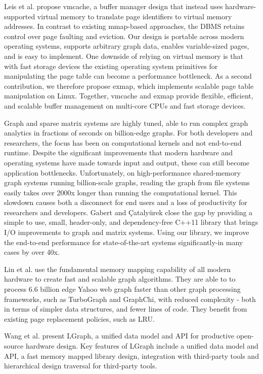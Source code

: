 Leis et al. \cite{leis2023virtual} propose vmcache, a buffer manager design that instead uses hardware-supported virtual memory to translate page identifiers to virtual memory addresses. In contrast to existing mmap-based approaches, the DBMS retains control over page faulting and eviction. Our design is portable across modern operating systems, supports arbitrary graph data, enables variable-sized pages, and is easy to implement. One downside of relying on virtual memory is that with fast storage devices the existing operating system primitives for manipulating the page table can become a performance bottleneck. As a second contribution, we therefore propose exmap, which implements scalable page table manipulation on Linux. Together, vmcache and exmap provide flexible, efficient, and scalable buffer management on multi-core CPUs and fast storage devices.




Graph and sparse matrix systems are highly tuned, able to run complex graph analytics in fractions of seconds on billion-edge graphs. For both developers and researchers, the focus has been on computational kernels and not end-to-end runtime. Despite the significant improvements that modern hardware and operating systems have made towards input and output, these can still become application bottlenecks. Unfortunately, on high-performance shared-memory graph systems running billion-scale graphs, reading the graph from file systems easily takes over 2000x longer than running the computational kernel. This slowdown causes both a disconnect for end users and a loss of productivity for researchers and developers. Gabert and Çatalyürek \cite{gabert2021pigo} close the gap by providing a simple to use, small, header-only, and dependency-free C++11 library that brings I/O improvements to graph and matrix systems. Using our library, we improve the end-to-end performance for state-of-the-art systems significantly-in many cases by over 40x.

Lin et al. \cite{lin2014mmap} use the fundamental memory mapping capability of all modern hardware to create fast and scalable graph algorithms. They are able to to process 6.6 billion edge Yahoo web graph faster than other graph processing frameworks, such as TurboGraph and GraphChi, with reduced complexity - both in terms of simpler data structures, and fewer lines of code. They benefit from existing page replacement policies, such as LRU.

Wang et al. \cite{wang2019lgraph} present LGraph, a unified data model and API for productive open-source hardware design. Key features of LGraph include a
unified data model and API, a fast memory mapped library design, integration with third-party tools and hierarchical design traversal for third-party tools.


